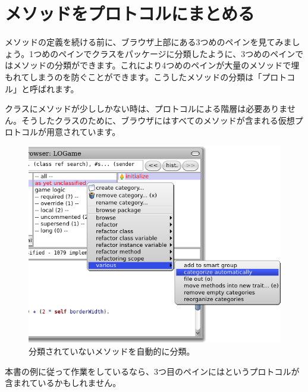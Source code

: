 \documentclass[a4paper,10pt,twoside]{book}
\begin{document}

\section{メソッドをプロトコルにまとめる}

メソッドの定義を続ける前に、ブラウザ上部にある3つめのペインを見てみましょう。1つめのペインでクラスをパッケージに分類したように、3つめのペインではメソッドの分類ができます。これにより4つめのペインが大量のメソッドで埋もれてしまうのを防ぐことができます。こうしたメソッドの分類は「プロトコル」と呼ばれます。


クラスにメソッドが少ししかない時は、プロトコルによる階層は必要ありません。そうしたクラスのために、ブラウザにはすべてのメソッドが含まれる仮想プロトコルが用意されています。


\begin{figure}[htbp]
   \centering
   \includegraphics[width=\textwidth]{Categorize}
   \caption{分類されていないメソッドを自動的に分類。 }
\end{figure}

本書の例に従って作業をしているなら、3つ目のペインにはというプロトコルが含まれているかもしれません。
\end{document}
